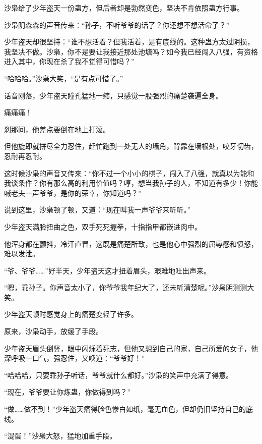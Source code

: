 
\begin{this_body}



沙枭给了少年盗天一份蛊方，但后者却是勃然变色，坚决不肯依照蛊方行事。

沙枭阴森森的声音传来：“孙子，不听爷爷的话了？你还想不想活命了？”

少年盗天却很坚持：“谁不想活着？但我活着，是有底线的。这种蛊方太过阴损，我坚决不做。沙枭，你不是要让我接近那处池塘吗？如今我已经闯入八强，有资格进入其中，你现在杀了我不觉得可惜吗？”

“哈哈哈。”沙枭大笑，“是有点可惜了。”

话音刚落，少年盗天瞳孔猛地一缩，只感觉一股强烈的痛楚袭遍全身。

痛痛痛！

刹那间，他差点要倒在地上打滚。

但他旋即就拼尽全力忍住，赶忙跑到一处无人的墙角，背靠在墙根处，咬牙切齿，忍耐再忍耐。

这时候沙枭的声音又传来：“你不过一个小小的棋子，闯入了八强，就真以为能和我谈条件？你有那么高的利用价值吗？哼，想当我孙子的人，不知道有多少！你能喊老夫一声爷爷，是你的荣幸，你知道吗？”

说到这里，沙枭顿了顿，又道：“现在叫我一声爷爷来听听。”

少年盗天满脸扭曲之色，双手死死握拳，十指指甲都嵌进肉中。

他浑身都在颤抖，冷汗直冒，这既是痛楚所致，也是他心中强烈的屈辱感和愤怒，难以发泄。

“爷、爷爷……”好半天，少年盗天这才扭着眉头，艰难地吐出声来。

“嗯，乖孙子。你声音太小了，你爷爷我年纪大了，还未听清楚呢。”沙枭阴测测大笑。

少年盗天顿时感觉身上的痛楚变轻了许多。

原来，沙枭动手，放缓了手段。

少年盗天眉头倒竖，眼中闪烁着死志，但他又想到自己的家，自己所爱的女子，他深呼吸一口气，强忍住，又唤道：“爷爷好！”

“哈哈哈，只要乖孙子听话，爷爷就什么都好。”沙枭的笑声中充满了得意。

“现在，爷爷要让你炼蛊，你做得到吗？”

“做……做不到！”少年盗天痛得脸色惨白如纸，毫无血色，但却仍旧坚持自己的底线。

“混蛋！”沙枭大怒，猛地加重手段。


\end{this_body}
